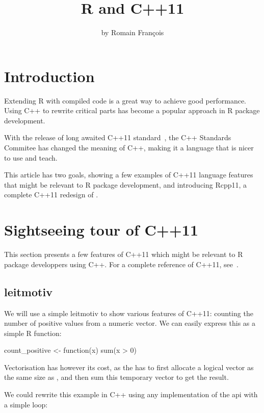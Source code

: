 \title{R and C++11}
\author{by Romain François}

\maketitle

\abstract{}

\section{Introduction}

Extending R with compiled code is a great way to achieve good performance. 
Using C++ to rewrite critical parts has become a popular approach
in R package development. 

With the release of long awaited C++11 standard~\citep{Cpp11}, 
the C++ Standards Commitee has changed the meaning of C++, making it 
a language that is nicer to use and teach. 

This article has two goals, 
showing a few examples of C++11 language features that might be 
relevant to R package development, and introducing
Rcpp11, a complete C++11 redesign of . 

\section{Sightseeing tour of C++11}

This section presents a few features of C++11 which might be 
relevant to R package developpers using C++. For a complete 
reference of C++11, see~\citep{Stroustrup2013}.

\subsection{leitmotiv}

We will use a simple leitmotiv to show various features of C++11: counting 
the number of positive values from a numeric vector. We can easily express
this as a simple R function:

\begin{example}
count_positive <- function(x){
  sum(x > 0)
}
\end{example}

Vectorisation has however its cost, as the  has to 
first allocate a logical vector as the same size as , and then 
sum this temporary vector to get the result. 

We could rewrite this example in C++ using any implementation of the 
 api with a simple  loop: 

